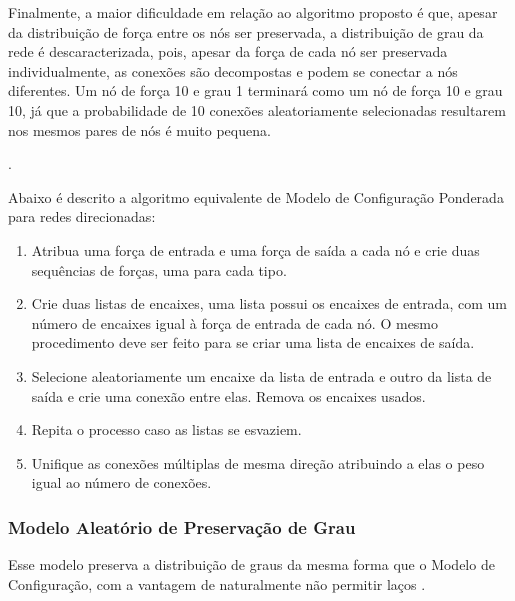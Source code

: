 \documentclass[12pt,a4paper]{article}
\theoremstyle{hypo}
\begin{document}
Finalmente, a maior dificuldade em relação ao algoritmo proposto é que, apesar da distribuição de força entre os nós ser preservada, a distribuição de grau da rede é descaracterizada, pois, apesar da força de cada nó ser preservada individualmente, as conexões são decompostas e podem se conectar a nós diferentes. Um nó de força 10 e grau 1 terminará como um nó de força 10 e grau 10, já que a probabilidade de 10 conexões aleatoriamente selecionadas resultarem nos mesmos pares de nós é muito pequena.

.

Abaixo é descrito a algoritmo equivalente de Modelo de Configuração Ponderada para redes direcionadas:

\begin{enumerate}
\item Atribua uma força de entrada e uma força de saída a cada nó e crie duas sequências de forças, uma para cada tipo.
\item Crie duas listas de encaixes, uma lista possui os encaixes de entrada, com um número de encaixes igual à força de entrada de cada nó. O mesmo procedimento deve ser feito para se criar uma lista de encaixes de saída.
\item Selecione aleatoriamente um encaixe da lista de entrada e outro da lista de saída e crie uma conexão entre elas. Remova os encaixes usados.
\item Repita o processo caso as listas se esvaziem.
\item Unifique as conexões múltiplas de mesma direção atribuindo a elas o peso igual ao número de conexões.
\end{enumerate}


\subsubsection{Modelo Aleatório de Preservação de Grau} \label{sec:modelo-preservacao-grau}

Esse modelo preserva a distribuição de graus da mesma forma que o Modelo de Configuração, com a vantagem de naturalmente não permitir laços \cite{Barabasi2016-rn}.
\end{document}
